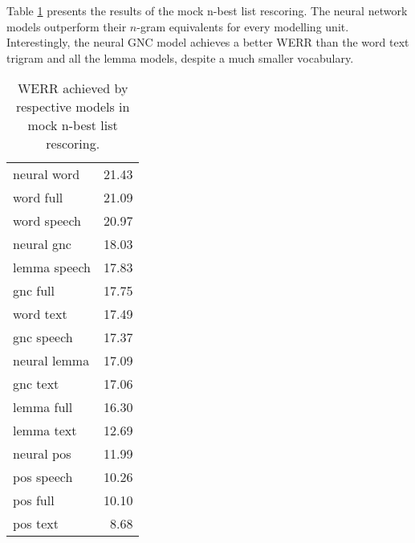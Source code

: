 Table \ref{table:max_werr_mock} presents the results of the mock n-best list rescoring. The neural network models outperform their \mbox{$n$-gram} equivalents for every modelling unit. Interestingly, the neural GNC model achieves a better WERR than the word text trigram and all the lemma models, despite a much smaller vocabulary.
\begin{table}[!htbp]
	\centering
	\caption[WERR achieved by respective models in mock \mbox{n-best} list rescoring]{WERR achieved by respective models in mock \mbox{n-best} list rescoring.}
	\label{table:max_werr_mock}
	\begin{tabular*}{.4\linewidth}{@{\extracolsep{\fill}}lr}
		neural word   & 21.43\\
		word full  & 21.09\\
		word speech  & 20.97\\
		neural gnc    & 18.03\\
		lemma speech  & 17.83\\
		gnc full  & 17.75\\
		word text  & 17.49\\
		gnc speech  & 17.37\\
		neural lemma  & 17.09\\
		gnc text  & 17.06\\
		lemma full  & 16.30\\
		lemma text  & 12.69\\
		neural pos    & 11.99\\
		pos speech  & 10.26\\
		pos full  & 10.10\\
		pos text  & 8.68\\
	\end{tabular*}
\end{table}
